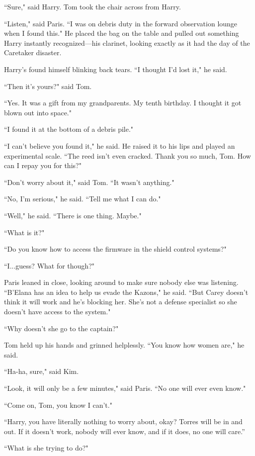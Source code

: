 \documentclass[twoside,letterpaper,12pt]{memoir}
\begin{document}
``Sure," said Harry. Tom took the chair across from Harry. 

``Listen," said Paris. ``I was on debris duty in the forward observation lounge when I found this." He placed the bag on the table and pulled out something Harry instantly recognized---his clarinet, looking exactly as it had the day of the Caretaker disaster. 

Harry's found himself blinking back tears. ``I thought I'd lost it," he said. 

``Then it's yours?" said Tom. 

``Yes. It was a gift from my grandparents. My tenth birthday. I thought it got blown out into space." 

``I found it at the bottom of a debris pile." 

``I can't believe you found it," he said. He raised it to his lips and played an experimental scale. ``The reed isn't even cracked. Thank you so much, Tom. How can I repay you for this?" 

``Don't worry about it," said Tom. ``It wasn't anything." 

``No, I'm serious," he said. ``Tell me what I can do." 

``Well," he said. ``There is one thing. Maybe." 

``What is it?" 

``Do you know how to access the firmware in the shield control systems?" 

``I...guess? What for though?" 

Paris leaned in close, looking around to make sure nobody else was listening. ``B'Elana has an idea to help us evade the Kazons," he said. ``But Carey doesn't think it will work and he's blocking her. She's not a defense specialist so she doesn't have access to the system." 

``Why doesn't she go to the captain?" 

Tom held up his hands and grinned helplessly. ``You know how women are," he said. 

``Ha-ha, sure," said Kim. 

``Look, it will only be a few minutes," said Paris. ``No one will ever even know." 

``Come on, Tom, you know I can't." 

``Harry, you have literally nothing to worry about, okay? Torres will be in and out. If it doesn't work, nobody will ever know, and if it does, no one will care.” 

``What is she trying to do?" 
\end{document}
